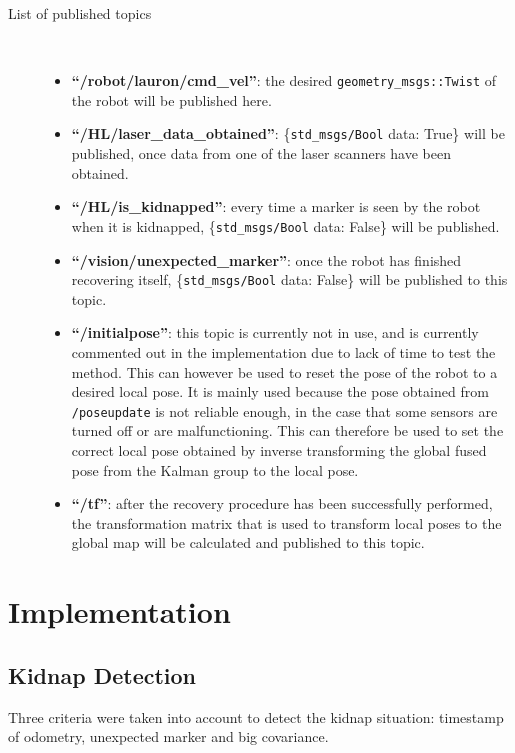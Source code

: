 \begin{description}	
\item[List of published topics]\
	\begin{itemize}
	\item \textbf{``/robot/lauron/cmd\_vel''}: the desired \texttt{geometry\_msgs::Twist} of the robot will be published here.
	\item \textbf{``/HL/laser\_data\_obtained''}: \{\texttt{std\_msgs/Bool} data: True\} will be published, once data from one of the laser scanners have been obtained.
	\item \textbf{``/HL/is\_kidnapped''}: every time a marker is seen by the robot when it is kidnapped, \{\texttt{std\_msgs/Bool} data: False\} will be published.
	\item \textbf{``/vision/unexpected\_marker''}: once the robot has finished recovering itself, \{\texttt{std\_msgs/Bool} data: False\} will be published to this topic.
	\item \textbf{``/initialpose''}: this topic is currently not in use, and is currently commented out in the implementation due to lack of time to test the method. This can however be used to reset the pose of the robot to a desired local pose. It is mainly used because the pose obtained from \texttt{/poseupdate} is not reliable enough, in the case that some sensors are turned off or are malfunctioning. This can therefore be used to set the correct local pose obtained by inverse transforming the global fused pose from the Kalman group to the local pose.
	\item \textbf{``/tf''}: after the recovery procedure has been successfully performed, the transformation matrix that is used to transform local poses to the global map will be calculated and published to this topic.
	\end{itemize}
\end{description}

\section{Implementation}\label{implementation}

\subsection{Kidnap Detection}\label{subsection:implementation_detection}
Three criteria were taken into account to detect the kidnap situation: timestamp of odometry, unexpected marker and big covariance.

